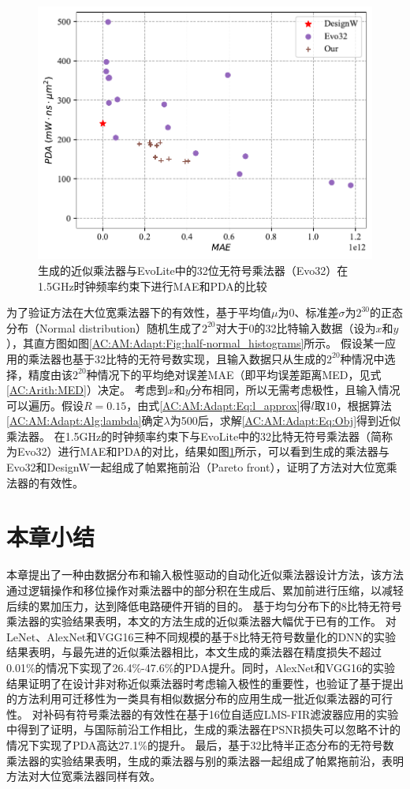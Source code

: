\begin{figure}[!h]
    \centering
    \includegraphics[width=0.8\linewidth]{figs/AC-AM-Adapt-half-normal_32x32_PDA_MAE.pdf}
    \caption{生成的近似乘法器与EvoLite中的32位无符号乘法器（Evo32）在1.5GHz时钟频率约束下进行MAE和PDA的比较}
    \label{AC:AM:Adapt:Fig:half-norm_32x32_PDA_MAE}
\end{figure}

为了验证方法在大位宽乘法器下的有效性，基于平均值$\mu$为0、标准差$\sigma$为$2^{30}$的正态分布（Normal distribution）随机生成了$2^{20}$对大于0的32比特输入数据（设为$x$和$y$），其直方图如图\ref{AC:AM:Adapt:Fig:half-normal_histograms}所示。
假设某一应用的乘法器也基于32比特的无符号数实现，且输入数据只从生成的$2^{20}$种情况中选择，精度由该$2^{20}$种情况下的平均绝对误差MAE（即平均误差距离MED，见式\eqref{AC:Arith:MED}）决定。
考虑到$x$和$y$分布相同，所以无需考虑极性，且输入情况可以遍历。假设$R=0.15$，由式\eqref{AC:AM:Adapt:Eq:l_approx}得$l$取$10$，根据算法\ref{AC:AM:Adapt:Alg:lambda}确定$\lambda$为500后，求解\eqref{AC:AM:Adapt:Eq:Obj}得到近似乘法器。
在1.5GHz的时钟频率约束下与EvoLite\cite{AC:AM:CGP_EvoLite}中的32比特无符号乘法器（简称为Evo32）进行MAE和PDA的对比，结果如图\ref{AC:AM:Adapt:Fig:half-norm_32x32_PDA_MAE}所示，可以看到生成的乘法器与Evo32和DesignW一起组成了帕累拖前沿（Pareto front），证明了方法对大位宽乘法器的有效性。

\section{本章小结}


本章提出了一种由数据分布和输入极性驱动的自动化近似乘法器设计方法，该方法通过逻辑操作和移位操作对乘法器中的部分积在生成后、累加前进行压缩，以减轻后续的累加压力，达到降低电路硬件开销的目的。
基于均匀分布下的8比特无符号乘法器的实验结果表明，本文的方法生成的近似乘法器大幅优于已有的工作。
对LeNet、AlexNet和VGG16三种不同规模的基于8比特无符号数量化的DNN的实验结果表明，与最先进的近似乘法器相比，本文生成的乘法器在精度损失不超过0.01\%的情况下实现了26.4\%-47.6\%的PDA提升。同时，AlexNet和VGG16的实验结果证明了在设计非对称近似乘法器时考虑输入极性的重要性，也验证了基于提出的方法利用可迁移性为一类具有相似数据分布的应用生成一批近似乘法器的可行性。
对补码有符号乘法器的有效性在基于16位自适应LMS-FIR滤波器应用的实验中得到了证明，与国际前沿工作相比，生成的乘法器在PSNR损失可以忽略不计的情况下实现了PDA高达27.1\%的提升。
最后，基于32比特半正态分布的无符号数乘法器的实验结果表明，生成的乘法器与别的乘法器一起组成了帕累拖前沿，表明方法对大位宽乘法器同样有效。
